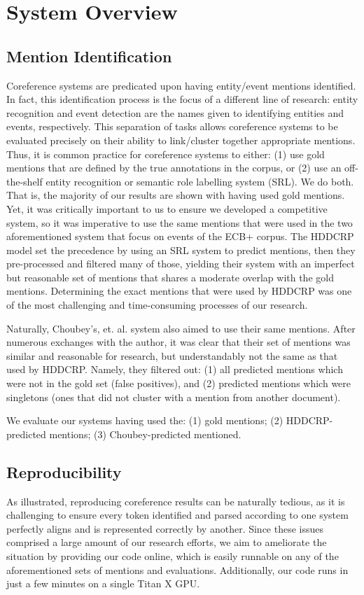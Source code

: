 \documentclass[11pt,a4paper]{article}
\begin{document}
\section{System Overview}
\subsection{Mention Identification}
\label{sec:mentionid}
Coreference systems are predicated upon having entity/event mentions identified.  In fact, this identification process is the focus of a different line of research: entity recognition and event detection are the names given to identifying entities and events, respectively.  This separation of tasks allows coreference systems to be evaluated precisely on their ability to link/cluster together appropriate mentions.  Thus, it is common practice for coreference systems to either: (1) use gold mentions that are defined by the true annotations in the corpus, or (2) use an off-the-shelf entity recognition or semantic role labelling system (SRL).  We do both.  That is, the majority of our results are shown with having used gold mentions.  Yet, it was critically important to us to ensure we developed a competitive system, so it was imperative to use the same mentions that were used in the two aforementioned system that focus on events of the ECB+ corpus.  The HDDCRP model set the precedence by using an SRL system to predict mentions, then they pre-processed and filtered many of those, yielding their system with an imperfect but reasonable set of mentions that shares a moderate overlap with the gold mentions.  Determining the exact mentions that were used by HDDCRP was one of the most challenging and time-consuming processes of our research.

Naturally, Choubey's, et. al. system also aimed to use their same mentions.  After numerous exchanges with the author, it was clear that their set of mentions was similar and reasonable for research, but understandably not the same as that used by HDDCRP.  Namely, they filtered out: (1) all predicted mentions which were not in the gold set (false positives), and (2) predicted mentions which were singletons (ones that did not cluster with a mention from another document).

We evaluate our systems having used the: (1) gold mentions; (2) HDDCRP-predicted mentions; (3) Choubey-predicted mentioned.

\subsection{Reproducibility}
As illustrated, reproducing coreference results can be naturally tedious, as it is challenging to ensure every token identified and parsed according to one system perfectly aligns and is represented correctly by another.  Since these issues comprised a large amount of our research efforts, we aim to ameliorate the situation by providing our code online, which is easily runnable on any of the aforementioned sets of mentions and evaluations.  Additionally, our code runs in just a few minutes on a single Titan X GPU.
\end{document}
